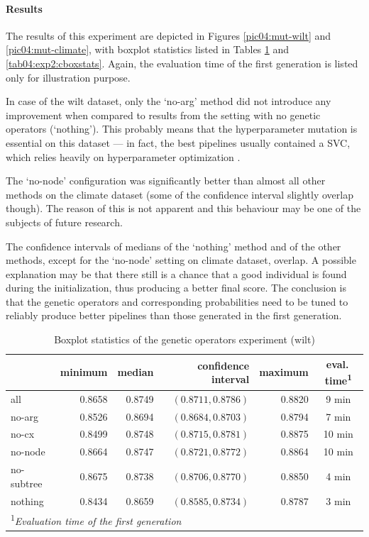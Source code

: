 \paragraph{Results}
The results of this experiment are depicted in Figures \ref{pic04:mut-wilt} and
\ref{pic04:mut-climate}, with boxplot statistics listed in Tables
\ref{tab04:exp2:wboxstats} and \ref{tab04:exp2:cboxstats}. Again, the evaluation
time of the first generation is listed only for illustration purpose.

In case of the wilt dataset, only the `no-arg' method did not introduce any improvement
when compared to results from the setting with no genetic operators (`nothing').
This probably means that the
hyperparameter mutation is essential on this dataset --- in fact, the best
pipelines usually contained a SVC, which relies heavily on hyperparameter
optimization \citep{Feurer:2015:ERA:2969442.2969547}.

The `no-node' configuration was significantly better than almost all other methods
on the climate dataset (some of the confidence interval slightly overlap though).
The reason of this is not apparent and this behaviour may be one of the subjects
of future research.

The confidence intervals of medians of the `nothing' method and of the other methods,
except for the `no-node' setting on climate dataset, overlap. A possible explanation may be that
there still is a chance that a good individual is found during the
initialization, thus producing a better final score. The conclusion is that the
genetic operators and corresponding probabilities need to be tuned to reliably
produce better pipelines than those generated in the first generation.

\begin{table}[ht]
\centering
\caption{Boxplot statistics of the genetic operators experiment (wilt)}\label{tab04:exp2:wboxstats}
\begin{tabular}{lrrrr|c}
\toprule
{} &  minimum &  median &  confidence interval &  maximum & eval.\,time\textsuperscript{1} \\
\midrule
all        &   0.8658 &  0.8749 &   $(0.8711,0.8786)$ &   0.8820 & 9 min \\
no-arg     &   0.8526 &  0.8694 &   $(0.8684,0.8703)$ &   0.8794 & 7 min \\
no-cx      &   0.8499 &  0.8748 &   $(0.8715,0.8781)$ &   0.8875 & 10 min \\
no-node    &   0.8664 &  0.8747 &   $(0.8721,0.8772)$ &   0.8864 & 10 min \\
no-subtree &   0.8675 &  0.8738 &   $(0.8706,0.8770)$ &   0.8850 & 4 min \\
nothing    &   0.8434 &  0.8659 &   $(0.8585,0.8734)$ &   0.8787 & 3 min \\
\bottomrule

\multicolumn{6}{l}{\footnotesize\textsuperscript{1}\itshape Evaluation time of the first generation}

\end{tabular}

\end{table}

